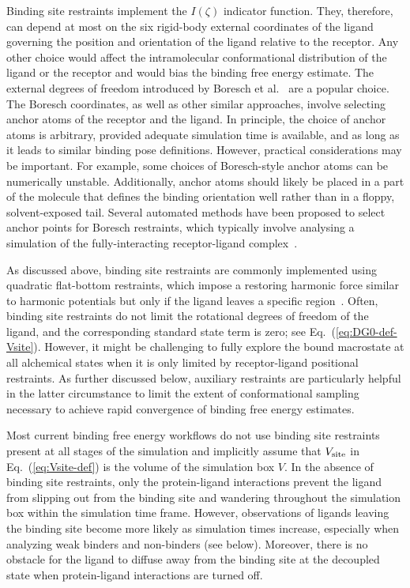 \documentclass[9pt,bestpractices]{livecoms}
\begin{document}
Binding site restraints implement the $I(\zeta)$ indicator function. They, therefore, can depend at most on the six rigid-body external coordinates of the ligand governing the position and orientation of the ligand relative to the receptor. Any other choice would affect the intramolecular conformational distribution of the ligand or the receptor and would  bias the binding free energy estimate. The external degrees of freedom introduced by Boresch et al.~\cite{boresch2003absolute,leitgeb2005alchemical} are a popular choice. The Boresch coordinates, as well as other similar approaches, involve selecting anchor atoms of the receptor and the ligand. In principle, the choice of anchor atoms is arbitrary, provided adequate simulation time is available, and as long as it leads to similar binding pose definitions. However, practical considerations may be important. For example, some choices of Boresch-style anchor atoms can be numerically unstable. Additionally, anchor atoms should likely be placed in a part of the molecule that defines the binding orientation well rather than in a floppy, solvent-exposed tail. Several automated methods have been proposed to select anchor points for Boresch restraints, which typically involve analysing a simulation of the fully-interacting receptor-ligand complex~\cite{alibay2022evaluating, alibay2021mdrestraintsgenerator, baumann2023broadening, chen2023enhancing, hedges2023suite, wu2025optimizing}.

As discussed above, binding site restraints are commonly implemented using quadratic flat-bottom restraints, which impose a restoring harmonic  force similar to harmonic potentials but only if the ligand leaves a specific region~\cite{chen2007can}. Often, binding site restraints do not limit the rotational degrees of freedom of the ligand, and the corresponding standard state term is zero; see Eq.~(\ref{eq:DG0-def-Vsite}). However, it might be challenging to fully explore the bound macrostate at all alchemical states when it is only limited by receptor-ligand positional restraints. As further discussed below, auxiliary restraints are particularly helpful in the latter circumstance to limit the extent of conformational sampling necessary to achieve rapid convergence of binding free energy estimates.

Most current binding free energy workflows do not use binding site restraints present at all stages of the simulation and implicitly assume that $V_{\rm site}$ in Eq.~(\ref{eq:Vsite-def}) is the volume of the simulation box $V$. In the absence of binding site restraints, only the protein-ligand interactions prevent the ligand from slipping out from the binding site and wandering throughout the simulation box within the simulation time frame. However, observations of ligands leaving the binding site become more likely as simulation times increase, especially when analyzing weak binders and non-binders (see below). Moreover, there is no obstacle for the ligand to diffuse away from the binding site at the decoupled state when protein-ligand interactions are turned off.
\end{document}
